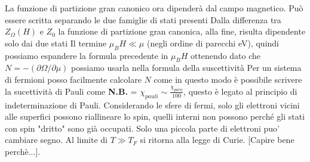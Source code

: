 La funzione di partizione gran canonico ora dipender\`a dal campo magnetico. Pu\`o essere scritta separando le due famiglie di stati presenti
Dalla differenza tra $Z_{\Omega} (H)$ e $Z_0$ la funzione di partizione gran canonica, alla fine, risulta dipendente solo dai due stati
Il termine $\mu_BH \ll \mu$ (negli ordine di parecchi eV), quindi possiamo espandere la formula precedente in $\mu_BH$ ottenendo
dato che $N = - (\partial\Omega / \partial\mu)$ possiamo usarla nella formula della suscettivit\`a 
Per un sistema di fermioni posso facilmente calcolare $N$ come 
in questo modo \`e possibile scrivere la sucettivit\`a di Pauli come
\textbf{N.B.} = $\chi_{pauli} \sim \frac{\chi_{para}}{100}$, questo \`e legato al principio di indeterminazione di Pauli. Considerando le sfere di fermi, solo gli elettroni vicini alle superfici possono riallineare lo spin, quelli interni non possono perch\'e gli stati con spin "dritto" sono gi\`a occupati. Solo una piccola parte di elettroni puo' cambiare segno. Al limite di $T \gg T_F$ si ritorna alla legge di Curie. [Capire bene perch\`e...]. 
